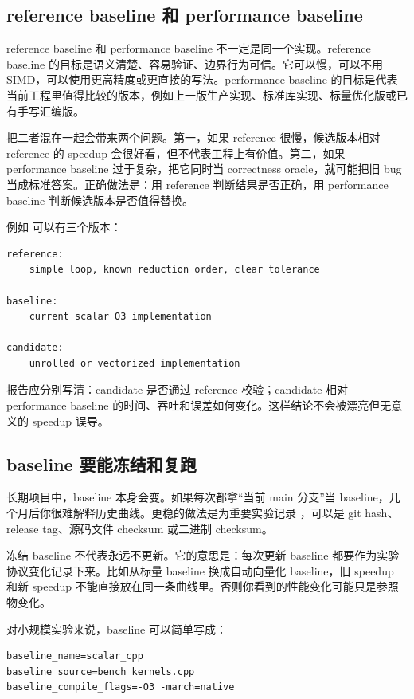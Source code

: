 \subsection{reference baseline 和 performance baseline}

reference baseline 和 performance baseline 不一定是同一个实现。reference baseline 的目标是语义清楚、容易验证、边界行为可信。它可以慢，可以不用 SIMD，可以使用更高精度或更直接的写法。performance baseline 的目标是代表当前工程里值得比较的版本，例如上一版生产实现、标准库实现、标量优化版或已有手写汇编版。

把二者混在一起会带来两个问题。第一，如果 reference 很慢，候选版本相对 reference 的 speedup 会很好看，但不代表工程上有价值。第二，如果 performance baseline 过于复杂，把它同时当 correctness oracle，就可能把旧 bug 当成标准答案。正确做法是：用 reference 判断结果是否正确，用 performance baseline 判断候选版本是否值得替换。

例如  可以有三个版本：

\begin{lstlisting}
reference:
    simple loop, known reduction order, clear tolerance

baseline:
    current scalar O3 implementation

candidate:
    unrolled or vectorized implementation
\end{lstlisting}

报告应分别写清：candidate 是否通过 reference 校验；candidate 相对 performance baseline 的时间、吞吐和误差如何变化。这样结论不会被漂亮但无意义的 speedup 误导。

\subsection{baseline 要能冻结和复跑}

长期项目中，baseline 本身会变。如果每次都拿“当前 main 分支”当 baseline，几个月后你很难解释历史曲线。更稳的做法是为重要实验记录 ，可以是 git hash、release tag、源码文件 checksum 或二进制 checksum。

冻结 baseline 不代表永远不更新。它的意思是：每次更新 baseline 都要作为实验协议变化记录下来。比如从标量 baseline 换成自动向量化 baseline，旧 speedup 和新 speedup 不能直接放在同一条曲线里。否则你看到的性能变化可能只是参照物变化。

对小规模实验来说，baseline 可以简单写成：

\begin{lstlisting}
baseline_name=scalar_cpp
baseline_source=bench_kernels.cpp
baseline_compile_flags=-O3 -march=native
\end{lstlisting}

